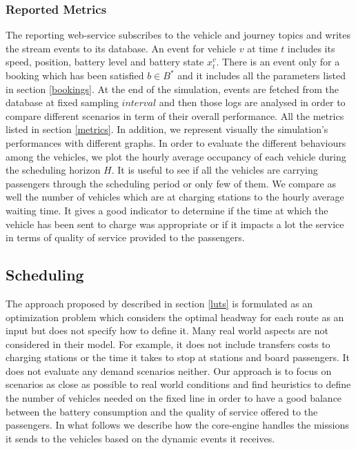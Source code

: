 \documentclass[12pt,a4paper]{article}
\begin{document}
\subsubsection{Reported Metrics}
The reporting web-service subscribes to the vehicle and journey topics and writes the stream events to its database. An event for vehicle $v$ at time $t$ includes its speed, position, battery level and battery state $x_{t}^{v}$. There is an event only for a booking which has been satisfied $b \in B^{*}$ and it includes all the parameters listed in section \ref{bookings}. At the end of the simulation, events are fetched from the database at fixed sampling $interval$ and then those logs are analysed in order to compare different scenarios in term of their overall performance. All the metrics listed in section \ref{metrics}. In addition, we represent visually the simulation's performances with different graphs. In order to evaluate the different behaviours among the vehicles, we plot the hourly average occupancy of each vehicle during the scheduling horizon $H$. It is useful to see if all the vehicles are carrying passengers through the scheduling period or only few of them. We compare as well the number of vehicles which are at charging stations to the hourly average waiting time. It gives a good indicator to determine if the time at which the vehicle has been sent to charge was appropriate or if it impacts a lot the service in terms of quality of service provided to the passengers.

\subsection{Scheduling}\label{scheduling}
The approach proposed by \cite{luts} described in section \ref{luts} is formulated as an optimization problem which considers the optimal headway for each route as an input but does not specify how to define it. Many real world aspects are not considered in their model. For example, it does not include transfers costs to charging stations or the time it takes to stop at stations and board passengers. It does not evaluate any demand scenarios neither. Our approach is to focus on scenarios as close as possible to real world conditions and find heuristics to define the number of vehicles needed on the fixed line in order to have a good balance between the battery consumption and the quality of service offered to the passengers. In what follows we describe how the core-engine handles the missions it sends to the vehicles based on the dynamic events it receives. 
\end{document}

